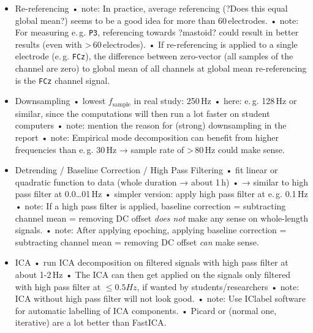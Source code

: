 	\begin{itemize}
		\item Re-referencing
			\newline • note: In practice, average referencing (?Does this equal global mean?) seems to be a good idea for more than 60 electrodes.
			\newline • note: For measuring e. g. \texttt{P3}, referencing towards ?mastoid? could result in better results (even with > 60 electrodes).
			\newline • If re-referencing is applied to a single electrode (e. g. \texttt{FCz}), the difference between zero-vector (all samples of the channel are zero) to global mean of all channels at global mean re-referencing is the \texttt{FCz} channel signal.
		\item Downsampling
			\newline • lowest \(f_\mathrm{sample}\) in real study: 250 Hz
			\newline • here: e. g. 128 Hz or similar, since the computations will then run a lot faster on student computers
			\newline • note: mention the reason for (strong) downsampling in the report
			\newline • note: Empirical mode decomposition can benefit from higher frequencies than e. g. 30 Hz → sample rate of > 80 Hz could make sense.
		\item Detrending / Baseline Correction / High Pass Filtering
			\newline • fit linear or quadratic function to data (whole duration → about 1 h)
			\newline • → similar to high pass filter at 0.0…01 Hz
			\newline • simpler version: apply high pass filter at e. g. 0.1 Hz
			\newline • note: If a high pass filter is applied, baseline correction = subtracting channel mean = removing DC offset \emph{does not} make any sense on whole-length signals.
			\newline • note: After applying epoching, applying baseline correction = subtracting channel mean = removing DC offset \emph{can} make sense.
		\item ICA
			\newline • run ICA decomposition on filtered signals with high pass filter at about 1-2 Hz
			\newline • The ICA can then get applied on the signals only filtered with high pass filter at \(≤ 0.5 Hz\), if wanted by students/researchers
			\newline • note: ICA without high pass filter will not look good.
			\newline • note: Use IClabel software for automatic labelling of ICA components.
			\newline • Picard or (normal one, iterative) are a lot better than FastICA.
	\end{itemize}

